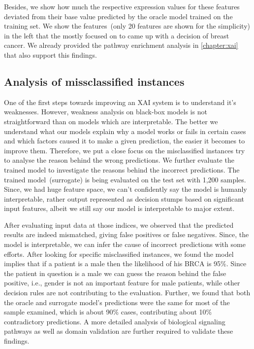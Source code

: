 \hspace*{3.5mm} Besides, we show how much the respective expression values for these features deviated from their base value predicted by the oracle model trained on the training set. We show the features~(only 20 features are shown for the simplicity) in the left that the mostly focused on to came up with a decision of breast cancer. We already provided the pathway enrichment analysis in \cref{chapter:xai} that also support this findings.  

\subsection{Analysis of missclassified instances}
One of the first steps towards improving an XAI system is to understand it’s weaknesses. However, weakness analysis on black-box models is not straightforward than on models which are interpretable. The better we understand what our models explain why a model works or fails in certain cases and which factors caused it to make a given prediction, the easier it becomes to improve them. Therefore, we put a close focus on the misclassified instances try to analyse the reason behind the wrong predictions. 
We further evaluate the trained model to investigate the reasons behind the incorrect predictions. The trained model~(surrogate) is being evaluated on the test set with 1,200 samples. Since, we had huge feature space, we can't confidently say the model is humanly interpretable, rather output represented as decision stumps based on significant input features, albeit we still say our model is interpretable to major extent. 

\hspace*{3.5mm} After evaluating input data at those indices, we observed that the predicted results are indeed mismatched, giving false positives or false negatives. Since, the model is interpretable, we can infer the cause of incorrect predictions with some efforts. After looking for specific misclassified instances, we found the model implies that if a patient is a male then the likelihood of his BRCA is 95\%. Since the patient in question is a male we can guess the reason behind the false positive, i.e., gender is not an important feature for male patients, while other decision rules are not contributing to the evaluation. Further, we found that both the oracle and surrogate model's predictions were the same for most of the sample examined, which is about 90\% cases, contributing about 10\% contradictory predictions. A more detailed analysis of biological signaling pathways as well as domain validation are further required to validate these findings. 

